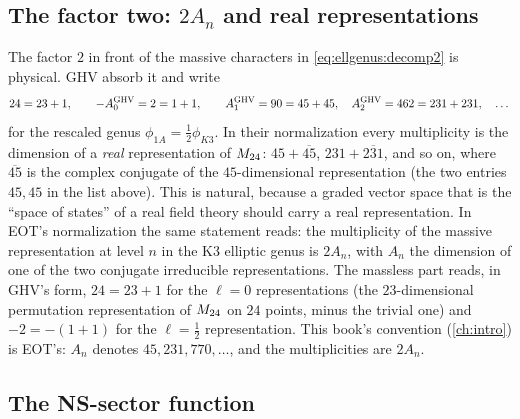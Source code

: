 \subsection{The factor two: \texorpdfstring{$2A_n$}{2 An} and real representations}\label{sec:ellgenus:2An}

The factor $2$ in front of the massive characters in \eqref{eq:ellgenus:decomp2} is
physical. GHV absorb it and write 
\begin{equation}\label{eq:ellgenus:ghv}
 24=23+1,\qquad -A_0^{\rm GHV}=2=1+1,\qquad A_1^{\rm GHV}=90=45+45,\quad
 A_2^{\rm GHV}=462=231+231,\quad\dots
\end{equation}
for the rescaled genus $\phi_{1A}=\tfrac12\phi_{K3}$. In their normalization every
multiplicity is the dimension of a \emph{real} representation of $M_{24}$: $45+\overline{45}$,
$231+\overline{231}$, and so on, where $\overline{45}$ is the complex conjugate of the
$45$-dimensional representation (the two entries $45,45$ in the list above). This is
natural, because a graded vector space that is the ``space of states'' of a real field theory
should carry a real representation. In EOT's normalization the same statement reads: the
multiplicity of the massive representation at level $n$ in the K3 elliptic genus is $2A_n$,
with $A_n$ the dimension of one of the two conjugate irreducible representations. The
massless part reads, in GHV's form, $24=23+1$ for the $\ell=0$ representations (the
$23$-dimensional permutation representation of $M_{24}$ on $24$ points, minus the trivial
one) and $-2=-(1+1)$ for the $\ell=\tfrac12$ representation. This book's convention
(\cref{ch:intro}) is EOT's: $A_n$ denotes $45,231,770,\dots$, and the multiplicities are
$2A_n$.

\subsection{The NS-sector function}\label{sec:ellgenus:ns}

